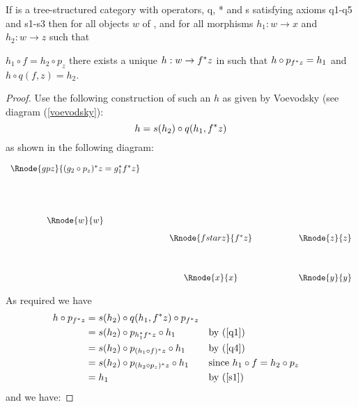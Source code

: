 \documentclass[10pt,a4paper]{scrartcl}
\begin{document}
\begin{lemma}
 If  is a tree-structured category with operators, q, * and s satisfying
axioms q1-q5 and s1-s3 then for all objects $w$ of , and for all
morphisms $h_1: w \rightarrow x$ and $h_2: w \rightarrow z$  such that

$h_1 \circ f = h_2 \circ p_z$ 
there exists a unique $h:w \rightarrow f ^* z$ in    such that
$h \circ p_{f ^* z} = h_1$ and $h \circ q(f,z) = h_2$.
\end{lemma}
\begin{proof}

Use the following construction of such an $h$ as given by Voevodsky  (see diagram (\ref{voevodsky}):
\begin{equation}
h = s(h_2) \circ q(h_1,f ^* z)
\end{equation}
as shown in the following diagram:
\vspace{3mm}
\begin{center}
\begin{equation}
\label{voevodsky}
\begin{array}{cp{0.5cm}cp{1.2cm}c}
\Rnode{gpz}{(g_2 \circ p_z)\sub z = g_1 \sub f \sub z} &&    &&   \\ [1.7cm]
\Rnode{w}{w} &&                     &&           \\ [0.3cm]
             &&\Rnode{fstarz}{f^*z} && \Rnode{z}{z}\\ [1.2cm]
             &&\Rnode{x}{x}         && \Rnode{y}{y}
\end{array}
\end{equation}
\setlength{\arrnodesepA}{3pt}
\end{center}
\noindent
As required we have 
\begin{align*}
h \circ p_{f ^* z}
                 & = s(h_2) \circ q(h_1,f ^* z) \circ p_{f ^* z} &\\
                 & = s(h_2) \circ p_{h_1 ^* f ^* z} \circ h_1 &&\mbox{by (\ref{q1})}\\
								& = s(h_2) \circ p_{(h_1 \circ f) ^* z} \circ h_1 &&\mbox{by (\ref{q4})}\\
								& = s(h_2) \circ p_{(h_2 \circ p_z) ^* z} \circ h_1 &&\mbox{since }h_1 \circ f = h_2 \circ p_z \\
                 & = h_1                                              &&\mbox{by (\ref{s1})}
\end{align*}
\noindent
and we have:


\end{proof}
\end{document}
